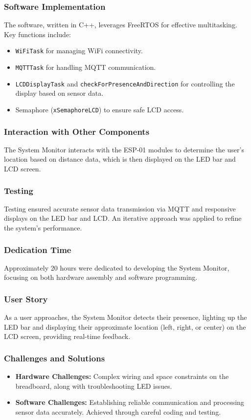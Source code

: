 \subsubsection{Software Implementation}
The software, written in C++, leverages FreeRTOS for effective multitasking. Key functions include:
\begin{itemize}
    \item \texttt{WiFiTask} for managing WiFi connectivity.
    \item \texttt{MQTTTask} for handling MQTT communication.
    \item \texttt{LCDDisplayTask} and \texttt{checkForPresenceAndDirection} for controlling the display based on sensor data.
    \item Semaphore (\texttt{xSemaphoreLCD}) to ensure safe LCD access.
\end{itemize}

\subsubsection{Interaction with Other Components}
The System Monitor interacts with the ESP-01 modules to determine the user's location based on distance data, which is then displayed on the LED bar and LCD screen.

\subsubsection{Testing}
Testing ensured accurate sensor data transmission via MQTT and responsive displays on the LED bar and LCD. An iterative approach was applied to refine the system's performance.

\subsubsection{Dedication Time}
Approximately 20 hours were dedicated to developing the System Monitor, focusing on both hardware assembly and software programming.

\subsubsection{User Story}
As a user approaches, the System Monitor detects their presence, lighting up the LED bar and displaying their approximate location (left, right, or center) on the LCD screen, providing real-time feedback.

\subsubsection{Challenges and Solutions}
\begin{itemize}
    \item \textbf{Hardware Challenges:} Complex wiring and space constraints on the breadboard, along with troubleshooting LED issues.
    \item \textbf{Software Challenges:} Establishing reliable communication and processing sensor data accurately. Achieved through careful coding and testing.
\end{itemize}

